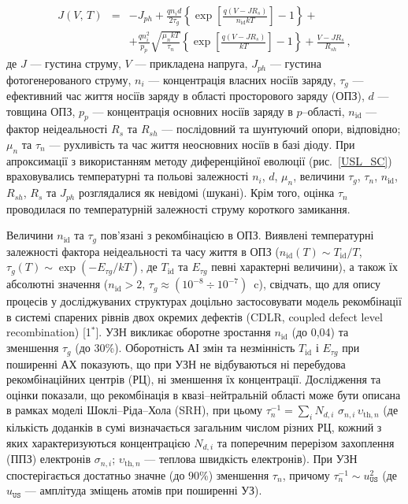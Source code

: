 \begin{eqnarray}
\label{eqSSCIV}
\nonumber J(V,\,T)&=&-J_{ph}+\frac{qn_id}{2\tau_{g}}\left\{\exp \left[\frac{q(V-JR_s)}{n_\mathrm{id}kT}\right]-1\right\}+\\
&&+\frac{qn_i^2}{p_p}\sqrt{\frac{\mu_nkT}{\tau_n}}\left\{\exp \left[\frac{q(V-JR_s)}{kT}\right]-1\right\}+\frac{V-JR_s}{R_{sh}}\,,
\end{eqnarray}
де
$J$ --- густина струму,
$V$ --- прикладена напруга,
$J_{ph}$ --- густина фотогенерованого струму,
$n_i$ --- концентрація власних носіїв заряду,
$\tau_{g}$  --- ефективний час життя носіїв заряду в області просторового заряду (ОПЗ),
$d$ --- товщина ОПЗ,
$p_p$ --- концентрація основних носіїв заряду в $p$--області,
$n_\mathrm{id}$ --- фактор неідеальності
$R_s$ та $R_{sh}$ --- послідовний та шунтуючий опори, відповідно;
$\mu_n$ та $\tau_n$ --- рухливість та час життя неосновних носіїв в базі діоду.
При апроксимації з використанням методу диференційної еволюції (рис.~\ref{USL_SC}) враховувались температурні та польові залежності $n_i$,
$d$, $\mu_n$, величини  $\tau_g$, $\tau_n$, $n_{\mathrm{id}}$, $R_{sh}$, $R_s$ та  $J_{ph}$ розглядалися як невідомі (шукані).
Крім того, оцінка $\tau_n$ проводилася по температурній залежності струму короткого замикання.

Величини $n_\mathrm{id}$ та $\tau_g$ пов'язані з рекомбінацією в ОПЗ.
Виявлені температурні залежності фактора неідеальності та часу життя в ОПЗ
($n_{\mathrm{id}}(T) \sim T_{\mathrm{id}}/T$,
$\tau_{g}(T)\sim\exp\left(-E_{\tau g}/kT\right)$,
де $T_{\mathrm{id}}$ та $E_{\tau g}$ певні характерні величини),
а також їх абсолютні значення ($n_{\mathrm{id}}>2$, $\tau_{g}\approx(10^{-8}\div10^{-7})$~c),
свідчать, що для опису процесів у досліджуваних структурах доцільно застосовувати модель рекомбінації в системі спарених рівнів двох окремих дефектів (CDLR, coupled defect level recombination)
[1$^*$].
УЗН викликає оборотне зростання $n_\mathrm{id}$  (до 0,04) та зменшення $\tau_g$ (до 30\%).
Оборотність АІ змін та незмінність $T_{\mathrm{id}}$ і $E_{\tau g}$ при поширенні АХ показують, що
при УЗН не відбуваються ні перебудова рекомбінаційних центрів (РЦ), ні зменшення їх концентрації.
Дослідження та оцінки показали, що рекомбінація в квазі--нейтральній області може бути описана в рамках моделі Шоклі--Ріда--Хола (SRH), при цьому $\tau_n^{-1}=\sum_i N_{d,i}\,\,\sigma_{n,i}\,\upsilon_{\mathrm{th},n}$
(де
кількість доданків в сумі визначається загальним числом різних РЦ,
кожний з яких характеризуються концентрацією $N_{d,i}$ та поперечним перерізом захоплення (ППЗ) електронів $\sigma_{n,i}$;
$\upsilon_{\mathrm{th},n}$ --- теплова швидкість електронів).
При УЗН спостерігається достатньо значне (до 90\%) зменшення $\tau_n$, причому
$\tau_{n}^{-1}\sim u_\mathtt{US}^2$ (де $u_\mathtt{US}$ --- амплітуда зміщень атомів при поширенні УЗ).

